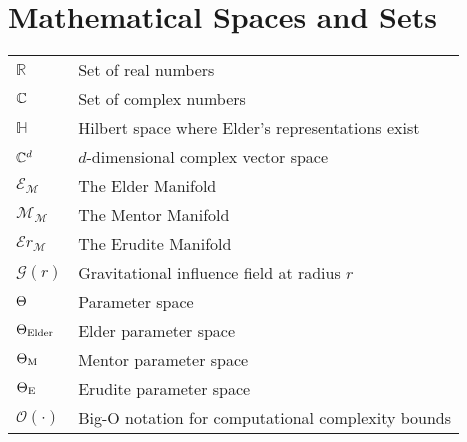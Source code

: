 \section*{Mathematical Spaces and Sets}
\vspace{-0.5em}
\begin{tabular}{p{3cm} p{12cm}}
$\mathbb{R}$ & Set of real numbers \\
$\mathbb{C}$ & Set of complex numbers \\
$\mathbb{H}$ & Hilbert space where Elder's representations exist \\
$\mathbb{C}^{d}$ & $d$-dimensional complex vector space \\
$\mathcal{E}_{\mathcal{M}}$ & The Elder Manifold \\
$\mathcal{M}_{\mathcal{M}}$ & The Mentor Manifold \\
$\mathcal{E}r_{\mathcal{M}}$ & The Erudite Manifold \\
$\mathcal{G}(r)$ & Gravitational influence field at radius $r$ \\
$\Theta$ & Parameter space \\
$\Theta_{\text{Elder}}$ & Elder parameter space \\
$\Theta_{\text{M}}$ & Mentor parameter space \\
$\Theta_{\text{E}}$ & Erudite parameter space \\
$\mathcal{O}(\cdot)$ & Big-O notation for computational complexity bounds \\
\end{tabular}

